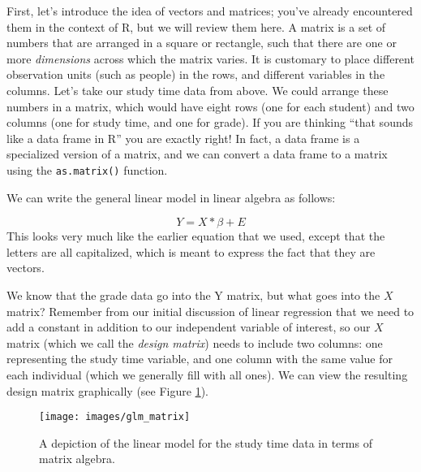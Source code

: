 \documentclass[]{book}
\newenvironment{Shaded}{\begin{snugshade}}{\end{snugshade}}
\newcommand{\KeywordTok}[1]{\textcolor[rgb]{0.13,0.29,0.53}{\textbf{#1}}}
\newcommand{\StringTok}[1]{\textcolor[rgb]{0.31,0.60,0.02}{#1}}
\newcommand{\OperatorTok}[1]{\textcolor[rgb]{0.81,0.36,0.00}{\textbf{#1}}}
\newcommand{\NormalTok}[1]{#1}
\theoremstyle{definition}
\theoremstyle{definition}
\theoremstyle{definition}
\theoremstyle{remark}
\begin{document}
First, let's introduce the idea of vectors and matrices; you've already
encountered them in the context of R, but we will review them here. A
matrix is a set of numbers that are arranged in a square or rectangle,
such that there are one or more \emph{dimensions} across which the
matrix varies. It is customary to place different observation units
(such as people) in the rows, and different variables in the columns.
Let's take our study time data from above. We could arrange these
numbers in a matrix, which would have eight rows (one for each student)
and two columns (one for study time, and one for grade). If you are
thinking ``that sounds like a data frame in R'' you are exactly right!
In fact, a data frame is a specialized version of a matrix, and we can
convert a data frame to a matrix using the \texttt{as.matrix()}
function.

\begin{Shaded}
\end{Shaded}

We can write the general linear model in linear algebra as follows:

\[
Y = X*\beta + E
\] This looks very much like the earlier equation that we used, except
that the letters are all capitalized, which is meant to express the fact
that they are vectors.

We know that the grade data go into the Y matrix, but what goes into the
\(X\) matrix? Remember from our initial discussion of linear regression
that we need to add a constant in addition to our independent variable
of interest, so our \(X\) matrix (which we call the \emph{design
matrix}) needs to include two columns: one representing the study time
variable, and one column with the same value for each individual (which
we generally fill with all ones). We can view the resulting design
matrix graphically (see Figure \ref{fig:GLMmatrix}).

\begin{figure}
\texttt{[image: images/glm\_matrix]} \caption{A depiction of the linear model for the study time data in terms of matrix algebra.}\label{fig:GLMmatrix}
\end{figure}
\end{document}

